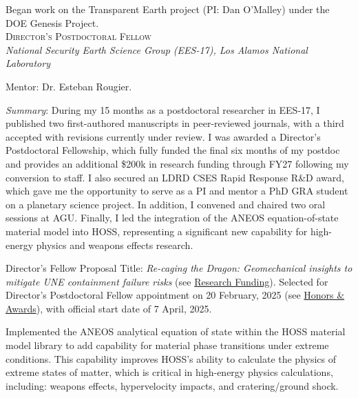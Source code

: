 \documentclass[11pt, letterpaper]{article}
\newcommand{\years}[1]{\marginnote{\scriptsize #1}}
\begin{document}
    Began work on the Transparent Earth project (PI: Dan O'Malley) under the
    DOE Genesis Project.
    \\

\noindent
\years{2025}\textsc{Director's Postdoctoral Fellow}\\
\textit{National Security Earth Science Group (EES-17), Los Alamos National Laboratory}

    \vspace{3pt} \noindent  
    Mentor: Dr. Esteban Rougier. 

\begin{mdframed}[hidealllines=true,backgroundcolor=gray!10]
    \textit{Summary}:  During my 15 months as a postdoctoral researcher in
    EES-17, I published two first-authored manuscripts in peer-reviewed
    journals, with a third accepted with revisions currently under review. I
    was awarded a Director's Postdoctoral Fellowship, which fully funded the
    final six months of my postdoc and provides an additional \$200k in
    research funding through FY27 following my conversion to staff. I also
    secured an LDRD CSES Rapid Response R\&D award, which gave me the
    opportunity to serve as a PI and mentor a PhD GRA student on a planetary
    science project. In addition, I convened and chaired two oral sessions at
    AGU. Finally, I led the integration of the ANEOS equation-of-state material
    model into HOSS, representing a significant new capability for high-energy
    physics and weapons effects research.
\end{mdframed}
    Director's Fellow Proposal Title: \textit{Re-caging the Dragon:
    Geomechanical insights to mitigate UNE containment failure risks} (see
    \hyperref[sec:funding]{Research Funding}). Selected for Director's
    Postdoctoral Fellow appointment on 20 February, 2025 (see
    \hyperref[sec:awards]{Honors \& Awards}), with official start date of 7
    April, 2025. 

    Implemented the ANEOS analytical equation of state within the HOSS material
    model library to add capability for material phase transitions under
    extreme conditions. This capability improves HOSS's ability to calculate
    the physics of extreme states of matter, which is critical in high-energy
    physics calculations, including: weapons effects, hypervelocity impacts,
    and cratering/ground shock. 
\end{document}
